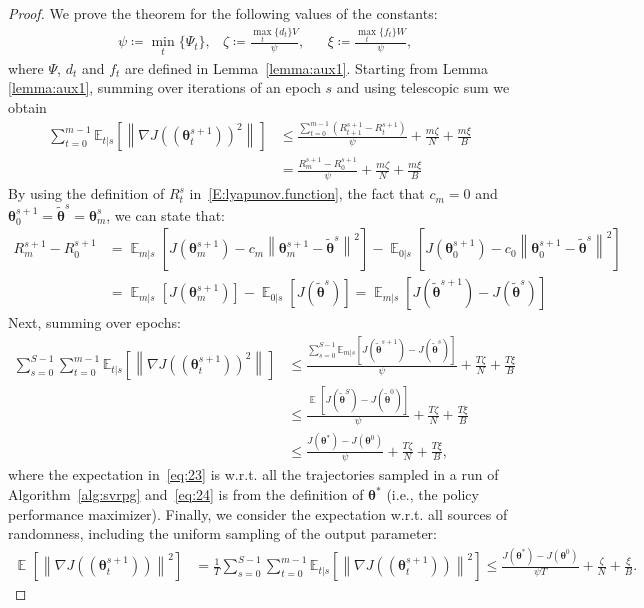 \documentclass{article}
\makeatletter
\theoremstyle{remark}
\theoremstyle{definition}
\DeclareRobustCommand{\ie}{i.e.,\@\xspace}
\DeclareRobustCommand{\wrt}{w.r.t.\@\xspace}
\DeclareMathOperator*{\EV}{\mathbb{E}}
\newcommand{\EVV}[2][\ppvect \in \ppspace]{\EV_{#1}\left[{#2}\right]}
\newcommand{\norm}[2][\infty]{\left\|#2\right\|_{#1}}
\newcommand{\vtheta}{\boldsymbol{\theta}}
\newcommand{\gradJ}[1]{\nabla J(#1)}
\newcommand{\Ets}[2][t]{\mathbb{E}_{#1\vert s}\left[#2\right]}
\newcommand{\wt}[1]{\widetilde{#1}}
\makeatother
\begin{document}
\convergence*
\begin{proof}
We prove the theorem for the following values of the constants:
\begin{align*}
& \psi \coloneqq \min_t\{\Psi_t\}, 
& \zeta \coloneqq \frac{\max_t\{d_t\}V}{\psi}, 
&& \xi \coloneqq \frac{\max_t\{f_t\}W}{\psi},
\end{align*}
where $\Psi$, $d_t$ and $f_t$ are defined in Lemma~\ref{lemma:aux1}.
Starting from Lemma \ref{lemma:aux1}, summing over iterations of an epoch $s$ and using telescopic sum we obtain
\begin{align*}
\sum_{t=0}^{m-1}\Ets{\norm[]{\gradJ{(\vtheta_t^{s+1})}^2}}&\leq
 \frac{\sum_{t=0}^{m-1}\left(R_{t+1}^{s+1} - R_t^{s+1}\right)}{\psi} + \frac{m\zeta}{N} + \frac{m\xi}{B} \nonumber\\
 & = \frac{R^{s+1}_m - R^{s+1}_0}{\psi}  + \frac{m\zeta}{N} + \frac{m\xi}{B}
\end{align*}
By using the definition of $R^s_t$ in~\eqref{E:lyapunov.function}, the fact that $c_m = 0$ and $\vtheta^{s+1}_0 = \wt{\vtheta}^s = \vtheta^s_m$, we can state that:
\begin{align*}
        R^{s+1}_m - R^{s+1}_0 
        &= \EVV[m|s]{J(\vtheta^{s+1}_{m})- c_m \norm[]{\vtheta^{s+1}_{m} - \wt{\vtheta}^s}^2 } - \EVV[0|s]{J(\vtheta^{s+1}_{0}) - c_0 \norm[]{\vtheta^{s+1}_0 - \wt{\vtheta}^s}^2}\\
        &= \EVV[m|s]{J(\vtheta^{s+1}_{m})} - \EVV[0|s]{J(\wt{\vtheta}^s)}
        = \EVV[m|s]{J(\wt{\vtheta}^{s+1}) - J(\wt{\vtheta}^s)}
\end{align*}
Next, summing over epochs:
\begin{align}
\sum_{s=0}^{S-1}\sum_{t=0}^{m-1}\Ets{\norm[]{\gradJ{(\vtheta_t^{s+1})}^2}}&\leq
\frac{\sum_{s=0}^{S-1}\Ets[m]{J(\tilde{\vtheta}^{s+1}) - J(\tilde{\vtheta}^{s})}}{\psi} + \frac{T\zeta}{N} + \frac{T\xi}{B} \nonumber\\
%
&\leq
\frac{\EVV[]{J(\tilde{\vtheta}^{S}) - J(\tilde{\vtheta}^{0})}}{\psi} + \frac{T\zeta}{N} + \frac{T\xi}{B}
 \label{eq:23}\\
%
&\leq
\frac{J(\vtheta^*) - J(\vtheta^0)}{\psi} + \frac{T\zeta}{N} + \frac{T\xi}{B}, \label{eq:24}
\end{align}
where the expectation in~\eqref{eq:23} is \wrt all the trajectories sampled in a run of Algorithm~\ref{alg:svrpg} and~\eqref{eq:24} is from the definition of $\vtheta^*$ (\ie the policy performance maximizer).
Finally, we consider the expectation \wrt all sources of randomness, including the uniform sampling of the output parameter:
\begin{align*}
\EVV[]{\norm[]{\gradJ{(\vtheta_t^{s+1})}}^2} 
&=\frac{1}{T}\sum_{s=0}^{S-1}\sum_{t=0}^{m-1}\Ets{\norm[]{\gradJ{(\vtheta_t^{s+1})}}^2} 
\leq
\frac{J(\vtheta^*) - J(\vtheta^0)}{\psi T} + \frac{\zeta}{N} + \frac{\xi}{B}.
\end{align*}


\end{proof}
\end{document}
